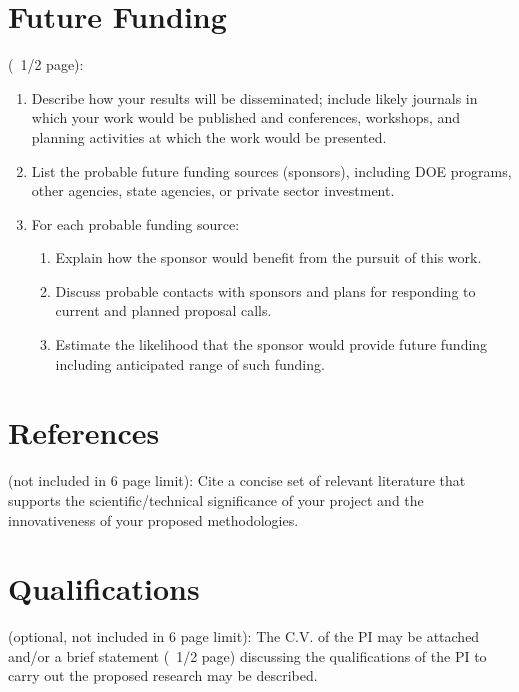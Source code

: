\documentclass[11pt]{article}
\begin{document}
\newpage

\section*{Future Funding} (~1/2 page):
\begin{enumerate}[label=\alph*]
\item Describe how your results will be disseminated; include likely journals in which your work would be published and conferences, workshops, and planning activities at which the work would be presented.

\item List the probable future funding sources (sponsors), including DOE programs, other agencies, state agencies, or private sector investment.

\item For each probable funding source:
\begin{enumerate}[label=\roman*]
\item Explain how the sponsor would benefit from the pursuit of this work.
\item Discuss probable contacts with sponsors and plans for responding to current and planned proposal calls.

\item Estimate the likelihood that the sponsor would provide future funding including anticipated range of such funding. 
\end{enumerate}
\end{enumerate}

\section*{References} (not included in 6 page limit): Cite a concise set of relevant literature that supports the scientific/technical significance of your project and the innovativeness of your proposed methodologies.

\section*{Qualifications} (optional, not included in 6 page limit): The C.V. of the PI may be attached and/or a brief statement (~1/2 page) discussing the qualifications of the PI to carry out the proposed research may be described.
\end{document}

